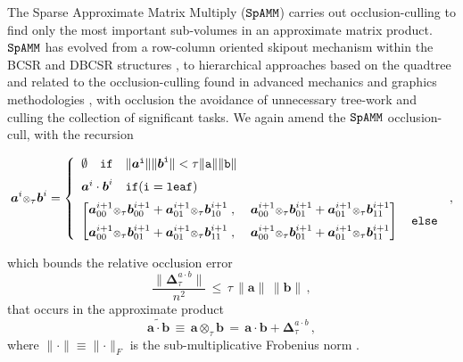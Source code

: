 \documentclass[letterpaper,twocolumn,amsmath,amsfont,amssymb,english,aps,jcp,preprintnumbers,groupaddress,nofootinbib,tightenlines,floatfix]{revtex4}
\newcommand{\mat}[1]{\boldsymbol{#1}}
\newcommand{\ot}{  {\scriptstyle \otimes}_{ \tau } }
\theoremstyle{plain}
\theoremstyle{remark}
\theoremstyle{plain}
\begin{document}
The Sparse Approximate Matrix Multiply ($\tt SpAMM$) carries out occlusion-culling to find only the
most important sub-volumes in an approximate matrix product. 
$\tt SpAMM$ has evolved from a row-column oriented skipout mechanism within the
BCSR and DBCSR structures \cite{challacombe1999simplified,Challacombe:2000:SpMM}, 
to hierarchical approaches based on the quadtree and related to 
the occlusion-culling found in advanced mechanics and graphics methodologies \cite{Challacombe2010}, 
with occlusion the avoidance of unnecessary tree-work and culling the collection of significant tasks. 
We again amend the $\tt SpAMM$ occlusion-cull,  with the recursion
\begin{widetext}
\begin{equation}\label{newspamm}
\mat{a}^{i} \ot \mat{b}^{i} =
\left\{
        \begin{array}{ll}
                 \emptyset \quad \tt{if}\quad \lVert \mat{a}^i \rVert \lVert \mat{b}^i \rVert < \tau \lVert a \rVert \lVert b \rVert \\[0.2cm]
                 \mat{a} ^i \cdot \mat{b}^i \quad  \tt{if}(i=\tt{leaf}) \\[0.2cm]
\begin{bmatrix} \mat{a}^{i+1}_{00} \ot \mat{b}^{i+1}_{00} +\mat{a}^{i+1}_{01} \ot \mat{b}^{i+1}_{10} \; , \; &
                \mat{a}^{i+1}_{00} \ot \mat{b}^{i+1}_{01} +\mat{a}^{i+1}_{01} \ot \mat{b}^{i+1}_{11}  \\[0.2cm]
                \mat{a}^{i+1}_{00} \ot \mat{b}^{i+1}_{01} +\mat{a}^{i+1}_{01} \ot \mat{b}^{i+1}_{11} \; , \; &
                \mat{a}^{i+1}_{00} \ot \mat{b}^{i+1}_{01} +\mat{a}^{i+1}_{01} \ot \mat{b}^{i+1}_{11}
\end{bmatrix}  \quad \tt{else}
                \end{array}
              \right.  \, ,
\end{equation}
\end{widetext}
which bounds the relative occlusion error
\begin{equation}\label{bound}
\frac{\lVert \mat{\Delta}^{a \cdot b}_{\tau} \rVert}{n^2 }  \, \leq \, \tau \, \lVert \mat{a} \rVert  \,  \lVert \mat{b} \rVert \, ,
\end{equation}
that occurs in the approximate product
\begin{equation}
\widetilde{\mat{a}\cdot \mat{b}} \,  \equiv \, \mat{a} \ot \mat{b} \,
  = \, \mat{a} \cdot \mat{b} + \mat{\Delta}^{a \cdot b}_{\tau} \, ,
\end{equation}
where $\lVert \cdot \rVert \equiv \lVert \cdot \rVert_F$ is the sub-multiplicative Frobenius norm \cite{Kahan2013}.
\end{document}
